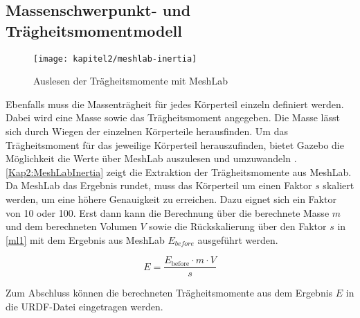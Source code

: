 \subsection{Massenschwerpunkt- und Trägheitsmomentmodell}

\begin{figure}[t!]
 \centering
 \texttt{[image: kapitel2/meshlab-inertia]}
 \caption{Auslesen der Trägheitsmomente mit MeshLab}
 \label{Kap2:MeshLabInertia}
\end{figure}

Ebenfalls muss die Massenträgheit für jedes Körperteil einzeln definiert werden. Dabei wird eine Masse sowie das Trägheitsmoment angegeben. Die Masse lässt sich durch Wiegen der einzelnen Körperteile herausfinden. Um das Trägheitsmoment für das jeweilige Körperteil herauszufinden, bietet Gazebo die Möglichkeit die Werte über MeshLab auszulesen und umzuwandeln \autocite{gazebo-inertial}. \autoref{Kap2:MeshLabInertia} zeigt die Extraktion der Trägheitsmomente aus MeshLab. Da MeshLab das Ergebnis rundet, muss das Körperteil um einen Faktor $s$ skaliert werden, um eine höhere Genauigkeit zu erreichen. Dazu eignet sich ein Faktor von 10 oder 100. Erst dann kann die Berechnung über die berechnete Masse $m$ und dem berechneten Volumen $V$ sowie die Rückskalierung über den Faktor $s$ in \autoref{ml1} mit dem Ergebnis aus MeshLab $E_{before}$ ausgeführt werden.

\begin{equation}
 E = \frac{E_{\textrm{before}} \cdot m \cdot V}{s}
\label{ml1}
\end{equation}

Zum Abschluss können die berechneten Trägheitsmomente aus dem Ergebnis $E$ in die \ac{URDF}-Datei eingetragen werden.